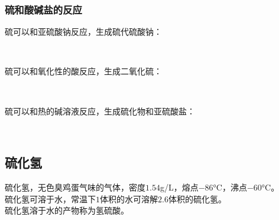 \documentclass[UTF8]{ctexart}
\begin{document}
\newpage

\subsubsection{硫和酸碱盐的反应}
    硫可以和亚硫酸钠反应，生成硫代硫酸钠：
    \begin{center}
        \\[4mm]
    \end{center}
    硫可以和氧化性的酸反应，生成二氧化硫：
    \begin{center}
        \\[4mm]
    \end{center}
    硫可以和热的碱溶液反应，生成硫化物和亚硫酸盐：
    \begin{center}
        \\[4mm]
    \end{center}

\subsection{硫化氢}
    硫化氢，无色臭鸡蛋气味的气体，密度$1.54$\si{g/L}，熔点$-86$\si{\degreeCelsius}，沸点$-60$\si{\degreeCelsius}。\\[3mm]
    硫化氢可溶于水，常温下$1$体积的水可溶解$2.6$体积的硫化氢。\\[3mm]
    硫化氢溶于水的产物称为氢硫酸。
\end{document}
